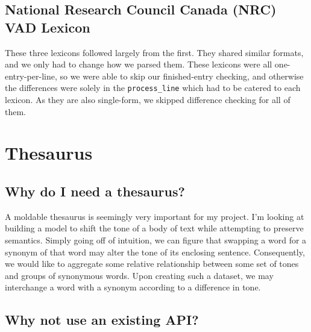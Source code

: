 \documentclass[11pt, twoside, reqno]{book}
\begin{document}
\section{National Research Council Canada (NRC) VAD Lexicon}

These three lexicons followed largely from the first. They shared similar formats, and we only had to change how we parsed them. These lexicons were all one-entry-per-line, so we were able to skip our finished-entry checking, and otherwise the differences were solely in the \texttt{process\_line} which had to be catered to each lexicon. As they are also single-form, we skipped difference checking for all of them.


\chapter{Thesaurus}




\section{Why do I need a thesaurus?}

A moldable thesaurus is seemingly very important for my project. I'm looking at building a model to shift the tone of a body of text while attempting to preserve semantics. Simply going off of intuition, we can figure that swapping a word for a synonym of that word may alter the tone of its enclosing sentence. Consequently, we would like to aggregate some relative relationship between some set of tones and groups of synonymous words. Upon creating such a dataset, we may interchange a word with a synonym according to a difference in tone.

\section{Why not use an existing API?}
\end{document}
